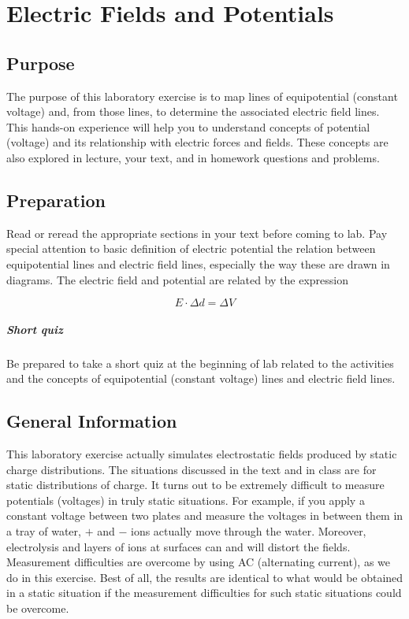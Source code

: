 
\chapter{Electric Fields and Potentials}

\section{Purpose}
The purpose of this laboratory exercise is to map lines of equipotential (constant voltage) and, from those lines, to determine the associated electric field lines. This hands-on experience will help you to understand concepts of potential (voltage) and its relationship with electric forces and fields.  These concepts are also explored in lecture, your text, and in homework questions and problems.
\section{Preparation}
Read or reread the appropriate sections in your text before coming to lab. Pay special attention to basic definition of electric potential the relation between equipotential lines and electric field lines, especially the way these are drawn in diagrams. The electric field and potential are related by the expression

\begin{equation} \label{e:EandV} E\cdot \Delta d = \Delta V \end{equation}

\paragraph{Short quiz} Be prepared to take a short quiz at the beginning of lab related to the activities and the concepts of equipotential (constant voltage) lines and electric field lines.

\section{General Information}

This laboratory exercise actually simulates electrostatic fields produced by static charge distributions.  The situations discussed in the text and in class are for static distributions of charge.  It turns out to be extremely difficult to measure potentials (voltages) in truly static situations.  For example, if you apply a constant voltage between two plates and measure the voltages in between them in a tray of water, $+$ and $-$ ions actually move through the water.  Moreover, electrolysis and layers of ions at surfaces can and will distort the fields.  Measurement difficulties are overcome by using AC (alternating current), as we do in this exercise.  Best of all, the results are identical to what would be obtained in a static situation if the measurement difficulties for such static situations could be overcome.

